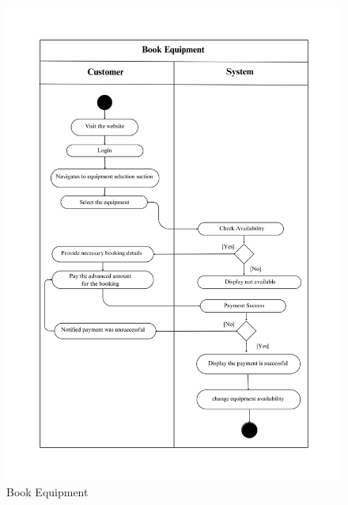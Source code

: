 \begin{figure}[h]
    \centering
    \includegraphics[width=1\textwidth]{Images/Activity Diagrams/23 Book Equipment.png}
    \caption{Book Equipment}
    \label{fig:activity-book-equ}
\end{figure}

